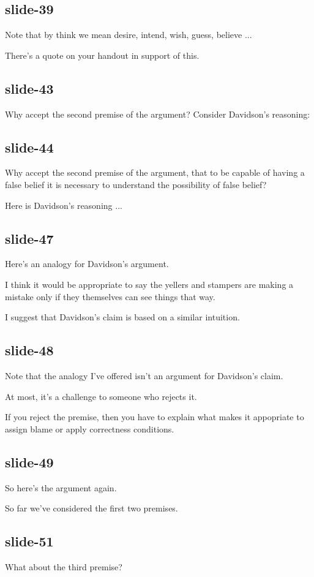\documentclass[12pt,\papersize]{extarticle}
\begin{document}
\subsection{slide-39}
Note that by think we mean desire, intend, wish, guess, believe ...
 
There's a quote on your handout in support of this.
 
\subsection{slide-43}
Why accept the second premise of the argument?  Consider Davidson's reasoning:
 
\subsection{slide-44}
Why accept the second premise of the argument, that to be capable of having a false belief it is necessary to understand the possibility of false belief?
 
Here is Davidson's reasoning ...
 
\subsection{slide-47}
Here's an analogy for Davidson's argument.
 
I think it would be appropriate to say the yellers and stampers are making a mistake only if they themselves can see things that way.
 
I suggest that Davidson's claim is based on a similar intuition.
 
\subsection{slide-48}
Note that the analogy I've offered isn't an argument for Davidson's claim.
 
At most, it's a challenge to someone who rejects it.
 
If you reject the premise, then you have to explain what makes it appopriate to assign blame or apply correctness conditions.
 
\subsection{slide-49}
So here's the argument again.
 
So far we've considered the first two premises.
 
\subsection{slide-51}
What about the third premise?
 
\end{document}
